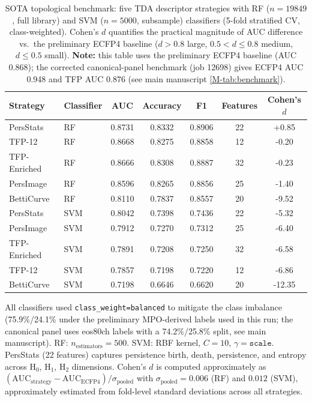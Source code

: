 \documentclass[11pt,a4paper]{article}
\begin{document}
\begin{table}[htbp]
\centering
\caption{SOTA topological benchmark: five TDA descriptor strategies with RF ($n = \num{19849}$, full library) and SVM ($n = 5000$, subsample) classifiers (5-fold stratified CV, class-weighted). Cohen's $d$ quantifies the practical magnitude of AUC difference vs.~the preliminary ECFP4 baseline ($d > 0.8$ large, $0.5 < d \leq 0.8$ medium, $d \leq 0.5$ small). \textbf{Note:} this table uses the preliminary ECFP4 baseline (AUC 0.868); the corrected canonical-panel benchmark (job 12698) gives ECFP4 AUC 0.948 and TFP AUC 0.876 (see main manuscript \cref{M-tab:benchmark}).}
\label{SM-tab:sota}
\begin{tabularx}{\textwidth}{l l S[table-format=1.4] S[table-format=1.4] S[table-format=1.4] S[table-format=1.0] S[table-format=+1.2]}
\toprule
{Strategy} & {Classifier} & {AUC} & {Accuracy} & {F1} & {Features} & {Cohen's $d$} \\
\midrule
PersStats & RF & 0.8731 & 0.8332 & 0.8906 & 22 & +0.85 \\
TFP-12 & RF & 0.8668 & 0.8275 & 0.8858 & 12 & -0.20 \\
TFP-Enriched & RF & 0.8666 & 0.8308 & 0.8887 & 32 & -0.23 \\
PersImage & RF & 0.8596 & 0.8265 & 0.8856 & 25 & -1.40 \\
BettiCurve & RF & 0.8110 & 0.7837 & 0.8557 & 20 & -9.52 \\
PersStats & SVM & 0.8042 & 0.7398 & 0.7436 & 22 & -5.32 \\
PersImage & SVM & 0.7912 & 0.7270 & 0.7312 & 25 & -6.40 \\
TFP-Enriched & SVM & 0.7891 & 0.7208 & 0.7250 & 32 & -6.58 \\
TFP-12 & SVM & 0.7857 & 0.7198 & 0.7220 & 12 & -6.86 \\
BettiCurve & SVM & 0.7198 & 0.6646 & 0.6620 & 20 & -12.35 \\
\bottomrule
\end{tabularx}
\vspace{1mm}
\footnotesize All classifiers used \texttt{class\_weight=balanced} to mitigate the class imbalance (75.9\%/24.1\% under the preliminary MPO-derived labels used in this run; the canonical panel uses eos80ch labels with a 74.2\%/25.8\% split, see main manuscript). RF: $n_{\text{estimators}} = 500$. SVM: RBF kernel, $C = 10$, $\gamma = \texttt{scale}$. PersStats (22 features) captures persistence birth, death, persistence, and entropy across H$_0$, H$_1$, H$_2$ dimensions. Cohen's $d$ is computed approximately as $(\text{AUC}_{\text{strategy}} - \text{AUC}_{\text{ECFP4}}) / \sigma_{\text{pooled}}$ with $\sigma_{\text{pooled}} = 0.006$ (RF) and $0.012$ (SVM), approximately estimated from fold-level standard deviations across all strategies.
\end{table}
\end{document}

